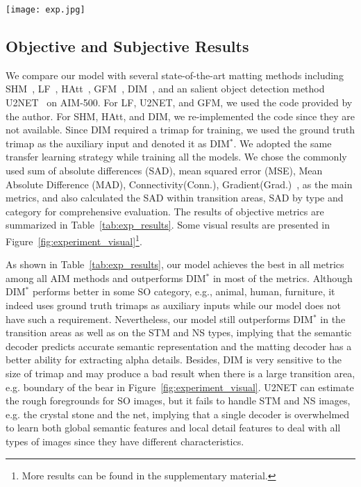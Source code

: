\documentclass{article}
\begin{document}
\begin{figure*}[htb!]
    \texttt{[image: exp.jpg]}
    \caption{Some visual results of different methods on AIM-500. More results can be found in the supplementary material.}
    \label{fig:experiment_visual}
\end{figure*}

\subsection{Objective and Subjective Results}

We compare our model with several state-of-the-art matting methods including SHM~\cite{chen2018semantic}, LF~\cite{Qiao_2020_CVPR}, HAtt~\cite{Qiao_2020_CVPR}, GFM~\cite{gfm}, DIM~\cite{xu2017deep}, and an salient object detection method U2NET~\cite{u2net} on AIM-500. For LF, U2NET, and GFM, we used the code provided by the author. For SHM, HAtt, and DIM, we re-implemented the code since they are not available. Since DIM required a trimap for training, we used the ground truth trimap as the auxiliary input and denoted it as DIM$^*$. We adopted the same transfer learning strategy while training all the models. We chose the commonly used sum of absolute differences (SAD), mean squared error (MSE), Mean Absolute Difference (MAD), Connectivity(Conn.), Gradient(Grad.)~\cite{rhemann2009perceptually}, as the main metrics, and also calculated the SAD within transition areas, SAD by type and category for comprehensive evaluation. The results of objective metrics are summarized in Table~\ref{tab:exp_results}. Some visual results are presented in Figure~\ref{fig:experiment_visual}\footnote{More results can be found in the supplementary material.}. 

As shown in Table~\ref{tab:exp_results}, our model achieves the best in all metrics among all AIM methods and outperforms DIM$^*$ in most of the metrics. Although DIM$^*$ performs better in some SO category, e.g., animal, human, furniture, it indeed uses ground truth trimaps as auxiliary inputs while our model does not have such a requirement. Nevertheless, our model still outperforms DIM$^*$ in the transition areas as well as on the STM and NS types, implying that the semantic decoder predicts accurate semantic representation and the matting decoder has a better ability for extracting alpha details. Besides, DIM is very sensitive to the size of trimap and may produce a bad result when there is a large transition area, e.g. boundary of the bear in Figure~\ref{fig:experiment_visual}. U2NET can estimate the rough foregrounds for SO images, but it fails to handle STM and NS images, e.g. the crystal stone and the net, implying that a single decoder is overwhelmed to learn both global semantic features and local detail features to deal with all types of images since they have different characteristics. 
\end{document}
